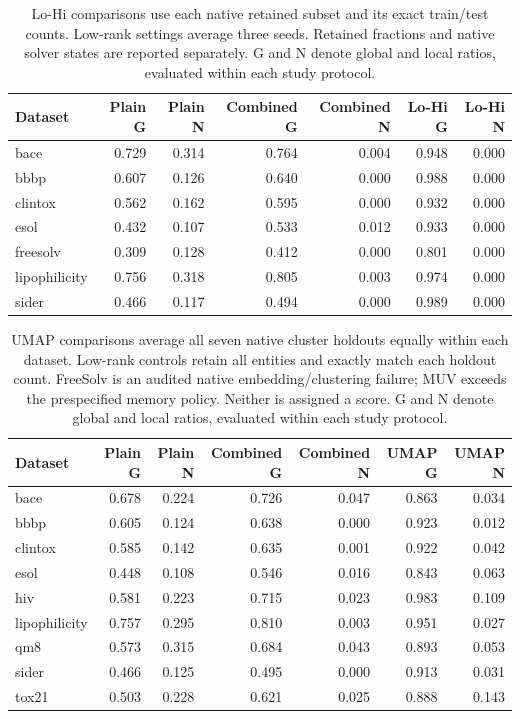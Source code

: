 \begin{table}[htbp]\centering\small
\begin{tabular}{lrrrrrr}
\toprule
Dataset & Plain G & Plain N & Combined G & Combined N & Lo-Hi G & Lo-Hi N \\
\midrule
bace & 0.729 & 0.314 & 0.764 & 0.004 & 0.948 & 0.000 \\
bbbp & 0.607 & 0.126 & 0.640 & 0.000 & 0.988 & 0.000 \\
clintox & 0.562 & 0.162 & 0.595 & 0.000 & 0.932 & 0.000 \\
esol & 0.432 & 0.107 & 0.533 & 0.012 & 0.933 & 0.000 \\
freesolv & 0.309 & 0.128 & 0.412 & 0.000 & 0.801 & 0.000 \\
lipophilicity & 0.756 & 0.318 & 0.805 & 0.003 & 0.974 & 0.000 \\
sider & 0.466 & 0.117 & 0.494 & 0.000 & 0.989 & 0.000 \\
\bottomrule
\end{tabular}

\caption{Lo-Hi comparisons use each native retained subset and its exact train/test counts. Low-rank settings average three seeds. Retained fractions and native solver states are reported separately. G and N denote global and local ratios, evaluated within each study protocol.}\end{table}
\begin{table}[htbp]\centering\small
\begin{tabular}{lrrrrrr}
\toprule
Dataset & Plain G & Plain N & Combined G & Combined N & UMAP G & UMAP N \\
\midrule
bace & 0.678 & 0.224 & 0.726 & 0.047 & 0.863 & 0.034 \\
bbbp & 0.605 & 0.124 & 0.638 & 0.000 & 0.923 & 0.012 \\
clintox & 0.585 & 0.142 & 0.635 & 0.001 & 0.922 & 0.042 \\
esol & 0.448 & 0.108 & 0.546 & 0.016 & 0.843 & 0.063 \\
hiv & 0.581 & 0.223 & 0.715 & 0.023 & 0.983 & 0.109 \\
lipophilicity & 0.757 & 0.295 & 0.810 & 0.003 & 0.951 & 0.027 \\
qm8 & 0.573 & 0.315 & 0.684 & 0.043 & 0.893 & 0.053 \\
sider & 0.466 & 0.125 & 0.495 & 0.000 & 0.913 & 0.031 \\
tox21 & 0.503 & 0.228 & 0.621 & 0.025 & 0.888 & 0.143 \\
\bottomrule
\end{tabular}

\caption{UMAP comparisons average all seven native cluster holdouts equally within each dataset. Low-rank controls retain all entities and exactly match each holdout count. FreeSolv is an audited native embedding/clustering failure; MUV exceeds the prespecified memory policy. Neither is assigned a score. G and N denote global and local ratios, evaluated within each study protocol.}\end{table}
